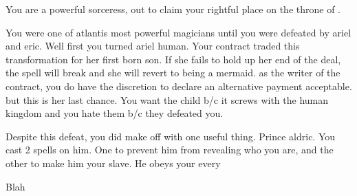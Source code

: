 \documentclass[char]{NeptuneBall}
\begin{document}
\name{\cWitch{}}



You are a powerful sorceress, out to claim your rightful place on the throne of \pAtlantis{}. 

You were one of atlantis most powerful magicians until you were defeated by ariel and eric.  Well first you turned ariel human. Your contract traded this transformation for her first born son. If she fails to hold up her end of the deal, the spell will break and she will revert to being a mermaid. as the writer of the contract, you do have the discretion to declare an alternative payment acceptable. but this is her last chance. You want the child b/c it screws with the human kingdom and you hate them b/c they defeated you.

Despite this defeat, you did make off with one useful thing. Prince aldric. You cast 2 spells on him. One to prevent him from revealing who you are, and the other to make him your slave. He obeys your every


\begin{itemz}[Goals]
  \item Blah
\end{itemz}

\begin{contacts}
  \contact{}
\end{contacts}
\end{document}
